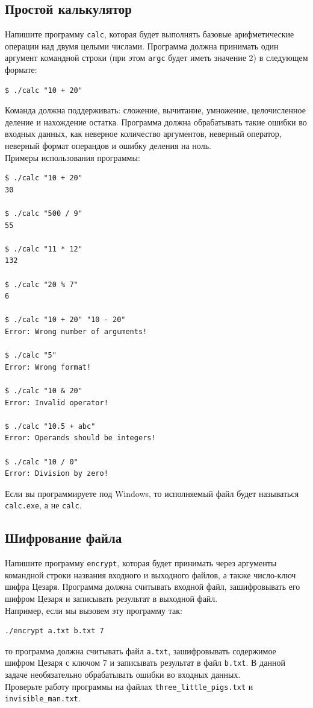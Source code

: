 \documentclass[10pt]{article}
\begin{document}
\subsection{Простой калькулятор}
Напишите программу \texttt{calc}, которая будет выполнять базовые арифметические операции над двумя целыми числами. Программа должна принимать один аргумент командной строки (при этом \texttt{argc} будет иметь значение 2) в следующем формате:
\begin{lstlisting}
$ ./calc "10 + 20"
\end{lstlisting}
Команда должна поддерживать: сложение, вычитание, умножение, целочисленное деление и нахождение остатка. Программа должна обрабатывать такие ошибки во входных данных, как неверное количество аргументов, неверный оператор, неверный формат операндов и ошибку деления на ноль. \\
Примеры использования программы:
\begin{lstlisting}
$ ./calc "10 + 20"
30

$ ./calc "500 / 9"
55

$ ./calc "11 * 12"
132

$ ./calc "20 % 7"
6

$ ./calc "10 + 20" "10 - 20"
Error: Wrong number of arguments!

$ ./calc "5"
Error: Wrong format!

$ ./calc "10 & 20"
Error: Invalid operator!

$ ./calc "10.5 + abc"
Error: Operands should be integers!

$ ./calc "10 / 0"
Error: Division by zero!
\end{lstlisting}
Если вы программируете под Windows, то исполняемый файл будет называться \texttt{calc.exe}, а не \texttt{calc}.


\newpage
\subsection{Шифрование файла}
Напишите программу \texttt{encrypt}, которая будет принимать через аргументы командной строки названия входного и выходного файлов, а также число-ключ шифра Цезаря. Программа должна считывать входной файл, зашифровывать его шифром Цезаря и записывать результат в выходной файл.\\
Например, если мы вызовем эту программу так:
\begin{verbatim}
./encrypt a.txt b.txt 7
\end{verbatim}
то программа должна считывать файл \texttt{a.txt}, зашифровывать содержимое шифром Цезаря с ключом 7 и записывать результат в файл \texttt{b.txt}. В данной задаче необязательно обрабатывать ошибки во входных данных.\\
Проверьте работу программы на файлах \texttt{three\_little\_pigs.txt} и \texttt{invisible\_man.txt}.
\end{document}
